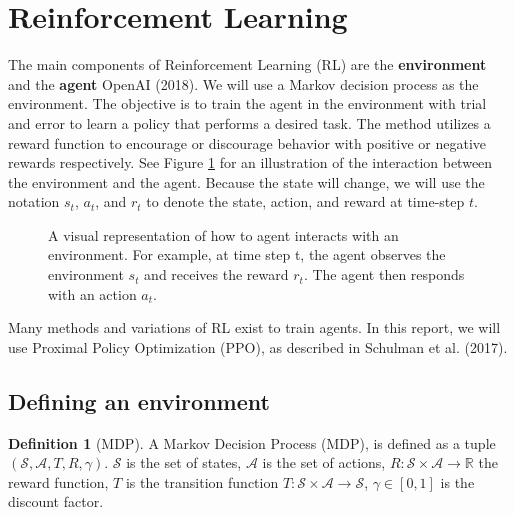 \documentclass[12pt,A4]{report}
\theoremstyle{definition}
\newtheorem{definition}{Definition}[section]
\begin{document}
\section{Reinforcement Learning}
The main components of Reinforcement Learning (RL) are the \textbf{environment} and the \textbf{agent} OpenAI (2018). We will use a Markov decision process as the environment. The objective is to train the agent in the environment with trial and error to learn a policy that performs a desired task. The method utilizes a reward function to encourage or discourage behavior with positive or negative rewards respectively. See Figure \ref{fig:RL} for an illustration of the interaction between the environment and the agent. Because the state will change, we will use the notation $s_t$, $a_t$, and $r_t$ to denote the state, action, and reward at time-step $t$.


\begin{figure}[H]
  
  \caption{A visual representation of how to agent interacts with an environment. For example, at time step t, the agent observes the environment $s_t$ and receives the reward $r_t$. The agent then responds with an action $a_t$.} 
  \label{fig:RL}
\end{figure} 
 
Many methods and variations of RL exist to train agents. In this report, we will use Proximal Policy Optimization (PPO), as described in Schulman et al. (2017).%

\subsection{Defining an environment}
\begin{definition}[MDP]
  A Markov Decision Process (MDP), is defined as a tuple $(\mathcal{S}, \mathcal{A}, T, R, \gamma)$. $\mathcal{S}$ is the set of states, $\mathcal{A}$ is the set of actions, $R: \mathcal{S} \times \mathcal{A} \rightarrow \mathbb{R}$ the reward function, $T$ is the transition function $T: \mathcal{S} \times \mathcal{A} \rightarrow \mathcal{S}$, $\gamma \in [0, 1]$ is the discount factor.
\end{definition}
\end{document}
